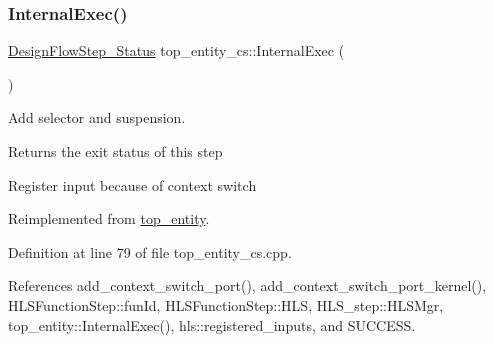 \subsubsection{\texorpdfstring{Internal\+Exec()}{InternalExec()}}
{\footnotesize\ttfamily \hyperlink{design__flow__step_8hpp_afb1f0d73069c26076b8d31dbc8ebecdf}{Design\+Flow\+Step\+\_\+\+Status} top\+\_\+entity\+\_\+cs\+::\+Internal\+Exec (\begin{DoxyParamCaption}{ }\end{DoxyParamCaption})\hspace{0.3cm}{\ttfamily [virtual]}}



Add selector and suspension. 

\begin{DoxyReturn}{Returns}
the exit status of this step 
\end{DoxyReturn}
Register input because of context switch 

Reimplemented from \hyperlink{classtop__entity_ae3b1c2be3024a1f3abfe3066d8db12fb}{top\+\_\+entity}.



Definition at line 79 of file top\+\_\+entity\+\_\+cs.\+cpp.



References add\+\_\+context\+\_\+switch\+\_\+port(), add\+\_\+context\+\_\+switch\+\_\+port\+\_\+kernel(), H\+L\+S\+Function\+Step\+::fun\+Id, H\+L\+S\+Function\+Step\+::\+H\+LS, H\+L\+S\+\_\+step\+::\+H\+L\+S\+Mgr, top\+\_\+entity\+::\+Internal\+Exec(), hls\+::registered\+\_\+inputs, and S\+U\+C\+C\+E\+SS.

